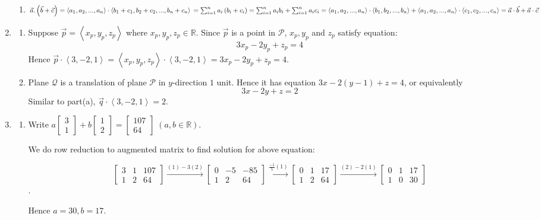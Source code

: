 \documentclass[letter]{article}
\newcommand{\mat}[1]{\begin{bmatrix}#1\end{bmatrix}}
\begin{document}
\begin{enumerate}
\begin{enumerate}
				\item $ \vec{a}. \left( \vec{b} + \vec{c} \right) = \left< a_1, a_2, ..., a_n \right> \cdot \left< b_1 + c_1, b_2 + c_2, ..., b_n + c_n \right> \\
					= \sum_{i=1}^n a_i \left( b_i + c_i \right) = \sum_{i=1}^n a_i b_i + \sum_{i=1}^n a_i c_i \\
					= \left< a_1, a_2, ..., a_n \right> \cdot \left< b_1, b_2, ..., b_n \right> + \left< a_1, a_2, ..., a_n \right> \cdot \left<c_1, c_2, ..., c_n \right> = \vec{a} \cdot \vec{b} + \vec{a} \cdot \vec{c}$
			\end{enumerate}

		\item 
			\begin{enumerate} 
				\item Suppose $\vec{p} = \left< x_p, y_p, z_p \right>$ where $x_p, y_p, z_p \in \mathbb{R}$. Since $\vec{p}$ is a point in $\mathcal{P}$, $x_p, y_p$ and $z_p$ satisfy equation:
					$$3x_p - 2y_p + z_p = 4$$
					Hence $\vec{p} \cdot \left< 3 , -2, 1 \right> = \left<x_p, y_p, z_p \right> \cdot \left< 3, -2, 1 \right> = 3x_p - 2y_p + z_p = 4$.

				\item Plane $\mathcal{Q}$ is a translation of plane $\mathcal{P}$ in $y$-direction $1$ unit. Hence it has equation $3x - 2(y-1) + z = 4$, or equivalently 
					$$3x - 2y + z = 2$$
					Similar to part(a), $\vec{q} \cdot \left<3, -2, 1 \right> = 2$.
			\end{enumerate}

		\item 
			\begin{enumerate}
				\item Write $a \mat{3 \\ 1} + b \mat{1 \\ 2} = \mat{107 \\ 64} \; (a,b \in \mathbb{R})$.

					We do row reduction to augmented matrix to find solution for above equation:

					$$\mat{3 & 1 & 107 \\ 1 & 2 & 64} \xrightarrow{(1) - 3 (2)} \mat{0 & -5 & -85 \\ 1 & 2 & 64} \xrightarrow{\frac{-1}{5} (1)} \mat{0 & 1 & 17 \\ 1 & 2 & 64} \xrightarrow{(2) - 2(1)} \mat{0 & 1 & 17 \\ 1 & 0 & 30}$$.

					Hence $a = 30, b = 17$. 


\end{enumerate}
\end{enumerate}
\end{document}
